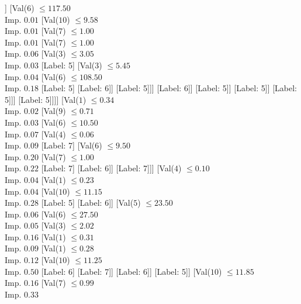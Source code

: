 \documentclass[margin=10pt]{standalone}
\begin{document}
\begin{forest}
				[Val($8$) $ \leq 3.08$ \\ Imp. $0.01$
					[Val($6$) $ \leq 107.00$ \\ Imp. $0.50$
						[Label: 5]
						[Label: 6]]
					[Val($6$) $ \leq 117.50$ \\ Imp. $0.01$
						[Val($10$) $ \leq 9.58$ \\ Imp. $0.01$
							[Val($7$) $ \leq 1.00$ \\ Imp. $0.01$
								[Val($7$) $ \leq 1.00$ \\ Imp. $0.06$
									[Val($3$) $ \leq 3.05$ \\ Imp. $0.03$
										[Label: 5]
										[Val($3$) $ \leq 5.45$ \\ Imp. $0.04$
											[Val($6$) $ \leq 108.50$ \\ Imp. $0.18$
												[Label: 5]
												[Label: 6]]
											[Label: 5]]]
									[Label: 6]]
								[Label: 5]]
							[Label: 5]]
						[Label: 5]]]
				[Label: 5]]]]
	[Val($1$) $ \leq 0.34$ \\ Imp. $0.02$
		[Val($9$) $ \leq 0.71$ \\ Imp. $0.03$
			[Val($6$) $ \leq 10.50$ \\ Imp. $0.07$
				[Val($4$) $ \leq 0.06$ \\ Imp. $0.09$
					[Label: 7]
					[Val($6$) $ \leq 9.50$ \\ Imp. $0.20$
						[Val($7$) $ \leq 1.00$ \\ Imp. $0.22$
							[Label: 7]
							[Label: 6]]
						[Label: 7]]]
				[Val($4$) $ \leq 0.10$ \\ Imp. $0.04$
					[Val($1$) $ \leq 0.23$ \\ Imp. $0.04$
						[Val($10$) $ \leq 11.15$ \\ Imp. $0.28$
							[Label: 5]
							[Label: 6]]
						[Val($5$) $ \leq 23.50$ \\ Imp. $0.06$
							[Val($6$) $ \leq 27.50$ \\ Imp. $0.05$
								[Val($3$) $ \leq 2.02$ \\ Imp. $0.16$
									[Val($1$) $ \leq 0.31$ \\ Imp. $0.09$
										[Val($1$) $ \leq 0.28$ \\ Imp. $0.12$
											[Val($10$) $ \leq 11.25$ \\ Imp. $0.50$
												[Label: 6]
												[Label: 7]]
											[Label: 6]]
										[Label: 5]]
									[Val($10$) $ \leq 11.85$ \\ Imp. $0.16$
										[Val($7$) $ \leq 0.99$ \\ Imp. $0.33$

\end{forest}
\end{document}
